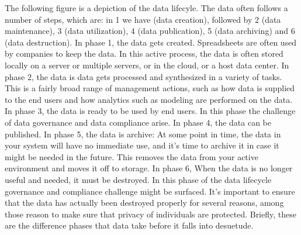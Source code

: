 \documentclass[sigconf]{acmart}
\begin{document}
The following figure is a depiction of the data lifecyle. The data often follows a number of steps, which are: in 1 we have (data creation), followed by 2 (data maintenance), 3 (data utilization), 4 (data publication), 5 (data archiving) and 6 (data destruction). In phase 1, the data gets created. Spreadsheets are often used by companies to keep the data. In this active process, the data is often stored locally on a server or multiple servers, or in the cloud, or a host data center. In phase 2, the data is data gets processed and synthesized in a variety of tasks. This is a fairly broad range of management actions, such as how data is supplied to the end users and how analytics such as modeling are performed on the data. In phase 3, the data is ready to be used by end users. In this phase the challenge of data governance and data compliance arise. In phase 4, the data can be published. In phase 5, the data is archive: At some point in time, the data in your system will have no immediate use, and it’s time to archive it in case it might be needed in the future. This removes the data from your active environment and moves it off to storage. In phase 6, When the data is no longer useful and needed, it must be destroyed. In this phase of the data lifecycle governance and compliance challenge might be surfaced. It’s important to ensure that the data has actually been destroyed properly for several reasons, among those reason to make sure that privacy of individuals are protected. Briefly, these are the difference phases that data take before it falls into desuetude. 
\end{document}

